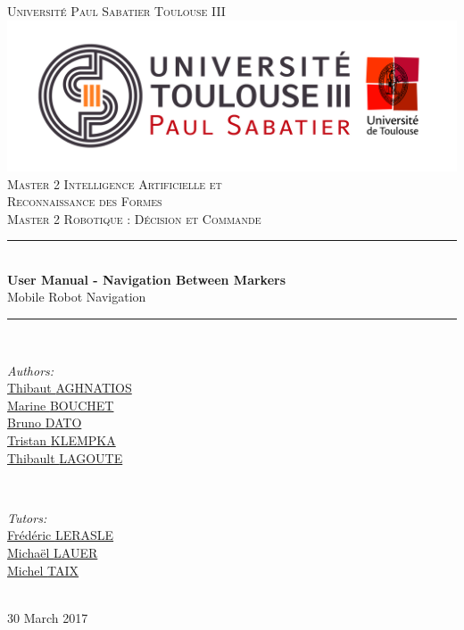 \documentclass[10pt,a4paper]{article}
\begin{document}
\pagestyle {plain}

\begin{titlepage}


\newcommand{\HRule}{\rule{\linewidth}{0.5mm}} 

\center

\textsc{\Large Université Paul Sabatier Toulouse III}\\[1cm] 
\includegraphics[scale=0.3]{UPS.jpg}\\[0.6cm] 


\textsc{Master 2 Intelligence Artificielle et \\ 
Reconnaissance des Formes \\ Master 2 Robotique : Décision et Commande}\\[3cm] 

\HRule \\[0.4cm]
{ \huge \bfseries User Manual - Navigation Between Markers}\\[0.4cm] 
\LARGE Mobile Robot Navigation

\HRule \\[1.5cm]
 

\begin{minipage}{0.4\textwidth}
\begin{flushleft} \large
\emph{Authors:}\\
\href{mailto:thibaut.aghnatios@laposte.net}{Thibaut \textsc{AGHNATIOS} }  \\
\href{mailto:bouchetmarinee@gmail.com}{Marine \textsc{BOUCHET} } \\
\href{mailto:bruno.dato.meneses@gmail.com}{Bruno \textsc{DATO} } \\
\href{mailto:klempka.tristan@gmail.com}{Tristan \textsc{KLEMPKA} } \\
\href{mailto:lagoute.31@gmail.com}{Thibault \textsc{LAGOUTE} }  
\end{flushleft}
\end{minipage}
~
\begin{minipage}{0.4\textwidth}
\begin{flushright} \large
\emph{Tutors:} \\
\href{mailto:lerasle@laas.fr}{Frédéric \textsc{LERASLE}}\\
\href{mailto:michael.lauer@laas.fr}{Michaël \textsc{LAUER}} \\
\href{mailto:taix@laas.f}{Michel \textsc{TAIX}}
\end{flushright}
\end{minipage}\\[5cm]


\large 30 March 2017
 

\end{titlepage}
\end{document}
